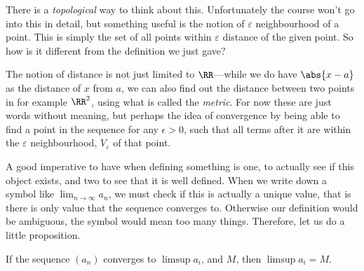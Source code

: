 \begin{remark}
    There is a \emph{topological} way to think about this. Unfortunately the course won't go
    into this in detail, but something useful is the notion of $\varepsilon$ neighbourhood of a point.
    This is simply the set of all points within $\varepsilon$ distance of the given point. So how
    is it different from the definition we just gave?

    The notion of distance is not just limited to $\RR$---while we do have $\abs{x-a}$ as
    the distance of $x$ from $a$, we can also find out the distance between two points in for
    example $\RR^2$, using what is called the \emph{metric}. For now these are just words without
    meaning, but perhaps the idea of convergence by being able to find a point in the sequence for
    any $\epsilon > 0$, such that all terms after it are within the $\varepsilon$ neighbourhood,
    $V_{\varepsilon}$ of that point.
\end{remark}

A good imperative to have when defining something is one, to actually see if this object exists,
and two to see that it is well defined. When we write down a symbol like $\lim_{n \to \infty} a_n$,
we must check if this is actually a unique value, that is there is only value that the sequence
converges to. Otherwise our definition would be ambiguous, the symbol would mean too many things.
Therefore, let us do a little proposition.

\begin{proposition*}
    If the sequence $(a_n)$ converges to $\limsup a_i$, and $M$, then $\limsup a_i = M$.
\end{proposition*}

